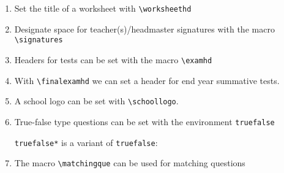 \documentclass[12pt,a4page]{article}
\def\cellwidth{0.4\textwidth}
\newcommand{\miniexample}[3][t]{%
  \parbox[#1][#3][t]{\cellwidth}{#2}
}
\newcommand{\codeexample}[3][c]{%
  \colorbox[HTML]{b0c4be}{\miniexample[#1]{}{#3}}
}
\newcommand{\textexample}[3][c]{%
  {\footnotesize
    \colorbox[gray]{0.9}{\miniexample[#1]{}{#3}}%
  }
}
\newcommand{\examplerow}[3][10pt]{%
  \par\noindent\strut\hfill\codeexample{#2}{#3}\hspace{#1}\textexample{#2}{#3}\hfill\strut
}
\newlength{\exheight}
\begin{document}
\begin{enumerate}
  Add a header for the exercise part of a document with \verb|\exercisepart|
  \examplerow{exampleMacroExercisepart.tex}{\exheight}
\item Set the title of a worksheet with \verb|\worksheethd|
  \setlength{\exheight}{70pt}
  \examplerow{exampleMacroWorksheethd.tex}{\exheight}
\item Designate space for teacher(s)/headmaster signatures with the macro
  \verb|\signatures|
  \setlength{\exheight}{68pt}
  \setlength{\signatureslength}{80pt}
  \setlength{\signaturelineskip}{25pt}
  \examplerow{exampleMacroSignatures.tex}{\exheight}
\item Headers for tests can be set with the macro \verb|\examhd|
  \examplerow{exampleMacroExamhd.tex}{\exheight}
\item With \verb|\finalexamhd| we can set a header for end year summative tests.
  \setlength{\exheight}{38pt}
  \examplerow{exampleMacroFinalExamhd.tex}{\exheight}
\item A school logo can be set with \verb|\schoollogo|.
  \setlength{\exheight}{53pt}
  \examplerow{exampleMacroSchoollogo.tex}{\exheight}
\item True-false type questions can be set with the environment \verb|truefalse|\\
  \setlength{\exheight}{77pt}
  \setlength{\truefalselength}{20pt}
  \examplerow{exampleEnvirTruefalse01.tex}{\exheight}

\noindent \verb|truefalse*| is a variant of \verb|truefalse|:
\setlength{\exheight}{95pt}
\setlength{\truefalselength}{30pt} 
\examplerow{exampleEnvirTruefalse02.tex}{\exheight}
\item The macro \verb|\matchingque| can be used for matching questions
  \setlength{\exheight}{117pt}
  \setlength{\leftmatchwidth}{10em}
  \setlength{\rightmatchwidth}{10em}
  \examplerow{exampleMacroMatchingque.tex}{\exheight}
\end{enumerate}
\end{document}
